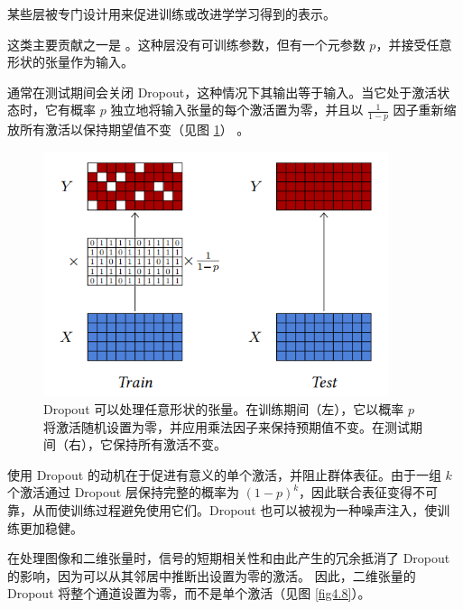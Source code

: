 某些层被专门设计用来促进训练或改进学学习得到的表示。

这类主要贡献之一是  \citep{srivastava14a}。这种层没有可训练参数，但有一个元参数 $p$，并接受任意形状的张量作为输入。

通常在测试期间会关闭 Dropout，这种情况下其输出等于输入。当它处于激活状态时，它有概率 $p$ 独立地将输入张量的每个激活置为零，并且以 $\frac{1}{1-p}$ 因子重新缩放所有激活以保持期望值不变（见图 \ref{fig4.7}） 。

\begin{figure}
    \centering
    \includegraphics[width=0.9\textwidth]{fig/fig4.7.png}
    \caption[Dropout]{Dropout 可以处理任意形状的张量。在训练期间（左），它以概率 $p$ 将激活随机设置为零，并应用乘法因子来保持预期值不变。在测试期间（右），它保持所有激活不变。}
    \label{fig4.7}
\end{figure}

使用 Dropout 的动机在于促进有意义的单个激活，并阻止群体表征。由于一组 $k$ 个激活通过 Dropout 层保持完整的概率为 $(1-p)^k$，因此联合表征变得不可靠，从而使训练过程避免使用它们。Dropout 也可以被视为一种噪声注入，使训练更加稳健。

在处理图像和二维张量时，信号的短期相关性和由此产生的冗余抵消了 Dropout 的影响，因为可以从其邻居中推断出设置为零的激活。 因此，二维张量的 Dropout 将整个通道设置为零，而不是单个激活（见图 \ref{fig4.8}）。

